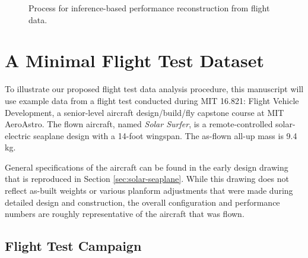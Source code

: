 \begin{figure}[h]
    \centering
    \caption{Process for inference-based performance reconstruction from flight data.}
    \label{fig:overall_procedure}
\end{figure}


\section{A Minimal Flight Test Dataset}

To illustrate our proposed flight test data analysis procedure, this manuscript will use example data from a flight test conducted during MIT 16.821: Flight Vehicle Development, a senior-level aircraft design/build/fly capstone course at MIT AeroAstro. The flown aircraft, named \emph{Solar Surfer}, is a remote-controlled solar-electric seaplane design with a 14-foot wingspan. The as-flown all-up mass is 9.4 kg.

General specifications of the aircraft can be found in the early design drawing that is reproduced in Section \ref{sec:solar-seaplane}. While this drawing does not reflect as-built weights or various planform adjustments that were made during detailed design and construction, the overall configuration and performance numbers are roughly representative of the aircraft that was flown.

\subsection{Flight Test Campaign}

